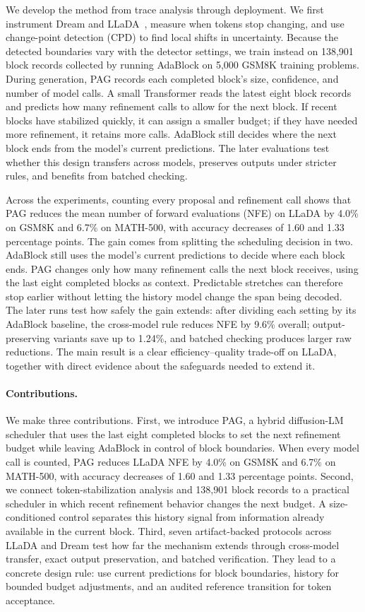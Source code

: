 \documentclass{article}
\newcommand{\pag}{PAG}
\newcommand{\nfe}{NFE}
\begin{document}
We develop the method from trace analysis through deployment. We first instrument Dream and LLaDA~\citep{ye2025dream,nie2025llada}, measure when tokens stop changing, and use change-point detection (CPD) to find local shifts in uncertainty. Because the detected boundaries vary with the detector settings, we train instead on 138{,}901 block records collected by running AdaBlock on 5{,}000 GSM8K training problems. During generation, PAG records each completed block's size, confidence, and number of model calls. A small Transformer reads the latest eight block records and predicts how many refinement calls to allow for the next block. If recent blocks have stabilized quickly, it can assign a smaller budget; if they have needed more refinement, it retains more calls. AdaBlock still decides where the next block ends from the model's current predictions. The later evaluations test whether this design transfers across models, preserves outputs under stricter rules, and benefits from batched checking.

Across the experiments, counting every proposal and refinement call shows that \pag{} reduces the mean number of forward evaluations (\nfe{}) on LLaDA by 4.0\% on GSM8K and 6.7\% on MATH-500, with accuracy decreases of 1.60 and 1.33 percentage points. The gain comes from splitting the scheduling decision in two. AdaBlock still uses the model's current predictions to decide where each block ends. PAG changes only how many refinement calls the next block receives, using the last eight completed blocks as context. Predictable stretches can therefore stop earlier without letting the history model change the span being decoded. The later runs test how safely the gain extends: after dividing each setting by its AdaBlock baseline, the cross-model rule reduces \nfe{} by 9.6\% overall; output-preserving variants save up to 1.24\%, and batched checking produces larger raw reductions. The main result is a clear efficiency--quality trade-off on LLaDA, together with direct evidence about the safeguards needed to extend it.

\paragraph{Contributions.}
We make three contributions. First, we introduce \pag{}, a hybrid diffusion-LM scheduler that uses the last eight completed blocks to set the next refinement budget while leaving AdaBlock in control of block boundaries. When every model call is counted, \pag{} reduces LLaDA \nfe{} by 4.0\% on GSM8K and 6.7\% on MATH-500, with accuracy decreases of 1.60 and 1.33 percentage points. Second, we connect token-stabilization analysis and 138{,}901 block records to a practical scheduler in which recent refinement behavior changes the next budget. A size-conditioned control separates this history signal from information already available in the current block. Third, seven artifact-backed protocols across LLaDA and Dream test how far the mechanism extends through cross-model transfer, exact output preservation, and batched verification. They lead to a concrete design rule: use current predictions for block boundaries, history for bounded budget adjustments, and an audited reference transition for token acceptance.
\end{document}
